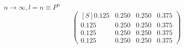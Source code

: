 \begin{multicols}{2}
$n \rightarrow \infty, l = n \equiv P^n$
\vspace{-.5em}
\[
\begin{pmatrix*}[S]
0.125	& 0.250	& 0.250	& 0.375\\
0.125	& 0.250	& 0.250	& 0.375\\
0.125	& 0.250	& 0.250	& 0.375\\
0.125	& 0.250	& 0.250	& 0.375
\end{pmatrix*}
\]\\

\phantom{
$n \rightarrow \infty, l = n \equiv P$
$\begin{pmatrix*}[S]
0.125	& 0.250	& 0.250	& 0.375\\
0.125	& 0.250	& 0.250	& 0.375\\
0.125	& 0.250	& 0.250	& 0.375\\
0.125	& 0.250	& 0.250	& 0.375
\end{pmatrix*}$}
\end{multicols}
